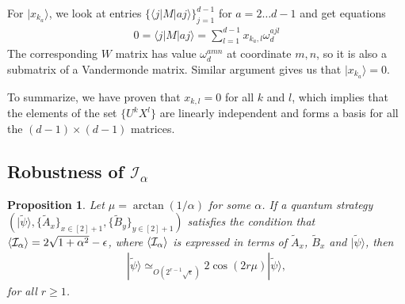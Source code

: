\documentclass[11pt,letterpaper]{article}
\newcommand{\ket}[1]{|#1\rangle}
\newcommand{\bra}[1]{\langle#1|}
\DeclarePairedDelimiter{\ip}{\langle}{\rangle}
\newcommand{\1}{\mathbb{1}}
\newcommand{\tA}{\tilde{A}}
\newcommand{\tB}{\tilde{B}}
\newcommand{\tpsi}{\tilde{\psi}}
\newcommand{\I}{\mathcal{I}}
\newcommand{\appd}[1]{\simeq_{#1}}
\newtheorem{proposition}[theorem]{Proposition}
\theoremstyle{definition}
\begin{document}
For $\ket{x_{k_a}}$, we look at entries $\{\bra{j}M\ket{aj}\}_{j=1}^{d-1}$ for $a = 2 \dots d-1$ and get equations
\begin{align}
	0 = \bra{j}M\ket{aj} = \sum_{l=1}^{d-1} x_{k_a, l} \omega_d^{ajl} 
\end{align}
The corresponding $W$ matrix has value $\omega_d^{amn}$ at coordinate $m,n$,
so it is also a submatrix of a Vandermonde matrix. Similar argument gives us that $\ket{x_{k_a}} = 0$.

To summarize, we have proven that $x_{k,l} = 0$ for all $k$ and $l$, which implies that the elements of the set
$\{ U^k X^l \}$ are linearly independent and forms a basis for all the $(d-1)\times(d-1)$ matrices.
\subsection{Robustness of $\I_\alpha$}
\begin{proposition}
\label{prop:2d-subspace}
	Let $\mu = \arctan(1/\alpha)$ for some $\alpha$.
	If a quantum strategy $(\ket{\tpsi}, \{\tilde{A}_x\}_{x \in [2]+1}, \{\tilde{B}_y\}_{y \in [2]+1})$ 
	satisfies the condition that $\ip{\I_\alpha} = 2\sqrt{1+\alpha^2}-\epsilon$, where 
	$\ip{\I_\alpha}$ is expressed in terms of $\tA_x$,  $\tB_x$ and $\ket{\tpsi}$,
	then  
	\begin{align}
		[(\tB_0\tB_1)^r + (\tB_1\tB_0)^r] \ket{\tpsi} \appd{O(2^{r-1}\sqrt{\epsilon})} 2\cos(2r\mu)\ket{\tpsi},
	\end{align}
	for all $r \geq 1$.
\end{proposition}
\end{document}
